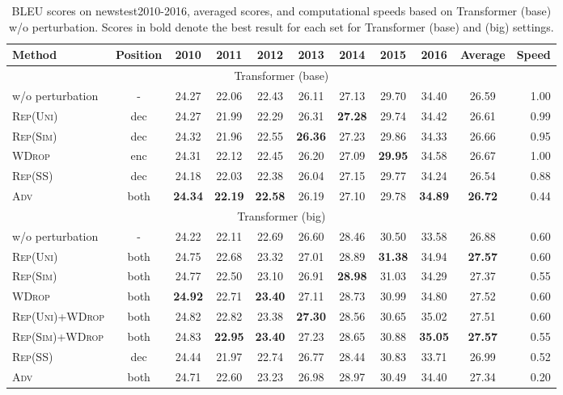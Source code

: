 \documentclass[11pt]{article}
\newcommand{\uniform}{\textsc{Rep(Uni)}}
\newcommand{\parass}{\textsc{Rep(SS)}}
\newcommand{\similarity}{\textsc{Rep(Sim)}}
\newcommand{\worddrop}{\textsc{WDrop}}
\newcommand{\adv}{\textsc{Adv}}
\begin{document}
\begin{table*}[!t]
  \centering{}
  \footnotesize
  \begin{tabular}{ l | c | c c c c c c c | c | r } \hline
  Method & Position & 2010 & 2011 & 2012 & 2013 & 2014 & 2015 & 2016 & Average & Speed \\ \hline \hline
  \multicolumn{11}{c}{Transformer (base)} \\ \hline \hline
  w/o perturbation & - & 24.27 & 22.06 & 22.43 & 26.11 & 27.13 & 29.70 & 34.40 & 26.59 & 1.00 \\ \hline
  \uniform{} & dec & 24.27 & 21.99 & 22.29 & 26.31 & \textbf{27.28} & 29.74 & 34.42 & 26.61 & 0.99 \\
  \similarity{} & dec & 24.32 & 21.96 & 22.55 & \textbf{26.36} & 27.23 & 29.86 & 34.33 & 26.66 & 0.95 \\
  \worddrop{} & enc & 24.31 & 22.12 & 22.45 & 26.20 & 27.09 & \textbf{29.95} & 34.58 & 26.67 & 1.00 \\
  \parass{} & dec & 24.18 & 22.03 & 22.38 & 26.04 & 27.15 & 29.77 & 34.24 & 26.54 & 0.88 \\
  \adv{} & both & \textbf{24.34} & \textbf{22.19} & \textbf{22.58} & 26.19 & 27.10 & 29.78 & \textbf{34.89} & \textbf{26.72}& 0.44 \\ \hline \hline
  \multicolumn{11}{c}{Transformer (big)} \\ \hline \hline 
  w/o perturbation & - & 24.22 & 22.11 & 22.69 & 26.60 & 28.46 & 30.50 & 33.58 & 26.88 & 0.60 \\ \hline
  \uniform{} & both & 24.75 & 22.68 & 23.32 & 27.01 & 28.89 & \textbf{31.38} & 34.94 & \textbf{27.57} & 0.60 \\
  \similarity{} & both & 24.77 & 22.50 & 23.10 & 26.91 & \textbf{28.98} & 31.03 & 34.29 & 27.37 & 0.55 \\
  \worddrop{} & both & \textbf{24.92} & 22.71 & \textbf{23.40} & 27.11 & 28.73 & 30.99 & 34.80 & 27.52 & 0.60 \\
  \uniform{}+\worddrop{} & both & 24.82 & 22.82 & 23.38 & \textbf{27.30} & 28.56 & 30.65 & 35.02 & 27.51 & 0.60 \\
  \similarity{}+\worddrop{} & both & 24.83 & \textbf{22.95} & \textbf{23.40} & 27.23 & 28.65 & 30.88 & \textbf{35.05} & \textbf{27.57} & 0.55  \\
  \parass{} & dec & 24.44 & 21.97 & 22.74 & 26.77 & 28.44 & 30.83 & 33.71 & 26.99& 0.52 \\
  \adv{} & both & 24.71 & 22.60 & 23.23 & 26.98 & 28.97 & 30.49 & 34.40 & 27.34& 0.20 \\ \hline
  \end{tabular}
  \caption{BLEU scores on newstest2010-2016, averaged scores, and computational speeds based on Transformer (base) w/o perturbation. Scores in bold denote the best result for each set for Transformer (base) and (big) settings.\label{tab:exp_mt_on_standard}}
\end{table*}
\end{document}
